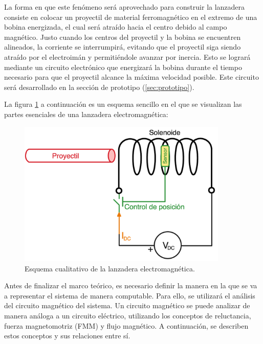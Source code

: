 La forma en que este fenómeno será aprovechado para construir la lanzadera consiste en colocar un proyectil de material ferromagnético en el extremo de una bobina energizada, el cual será atraído hacia el centro debido al campo magnético. Justo cuando los centros del proyectil y la bobina se encuentren alineados, la corriente se interrumpirá, evitando que el proyectil siga siendo atraído por el electroimán y permitiéndole avanzar por inercia. Esto se logrará mediante un circuito electrónico que energizará la bobina durante el tiempo necesario para que el proyectil alcance la máxima velocidad posible. Este circuito será desarrollado en la sección de prototipo (\ref{sec:prototipo}).

La figura \ref{fig:esquemabasico} a continuación es un esquema sencillo en el que se visualizan las partes esenciales de una lanzadera electromagnética:

\begin{figure}[H]
    \centering %
    \includegraphics[width=10cm]{FigurasMemoria/esquemabasico.png}
    \caption{Esquema cualitativo de la lanzadera electromagnética.}
    \label{fig:esquemabasico} %
\end{figure}

\newpage
Antes de finalizar el marco teórico, es necesario definir la manera en la que se va a representar el sistema de manera computable. Para ello, se utilizará el análisis del circuito magnético del sistema. Un circuito magnético se puede analizar de manera análoga a un circuito eléctrico, utilizando los conceptos de reluctancia, fuerza magnetomotriz (FMM) y flujo magnético. A continuación, se describen estos conceptos y sus relaciones entre sí.

